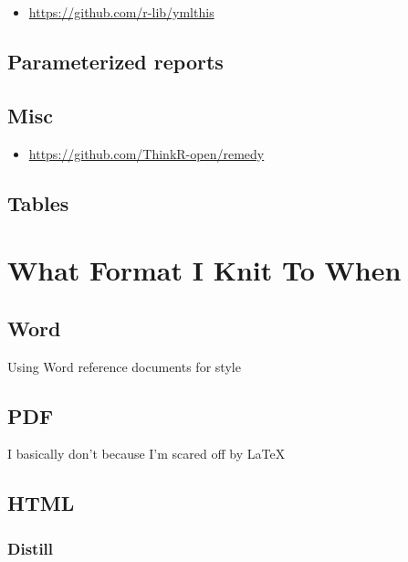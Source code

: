 \documentclass[]{book}
\providecommand{\tightlist}{%
  \setlength{\itemsep}{0pt}\setlength{\parskip}{0pt}}
\begin{document}
\begin{itemize}
\tightlist
\item
  \url{https://github.com/r-lib/ymlthis}
\end{itemize}

\hypertarget{parameterized-reports}{%
\subsection{Parameterized reports}\label{parameterized-reports}}

\hypertarget{misc}{%
\subsection{Misc}\label{misc}}

\begin{itemize}
\tightlist
\item
  \url{https://github.com/ThinkR-open/remedy}
\end{itemize}

\hypertarget{tables}{%
\subsection{Tables}\label{tables}}

\hypertarget{what-format-i-knit-to-when}{%
\section{What Format I Knit To When}\label{what-format-i-knit-to-when}}

\hypertarget{word}{%
\subsection{Word}\label{word}}

Using Word reference documents for style

\hypertarget{pdf}{%
\subsection{PDF}\label{pdf}}

I basically don't because I'm scared off by LaTeX

\hypertarget{html}{%
\subsection{HTML}\label{html}}

\hypertarget{distill}{%
\subsubsection{Distill}\label{distill}}
\end{document}
